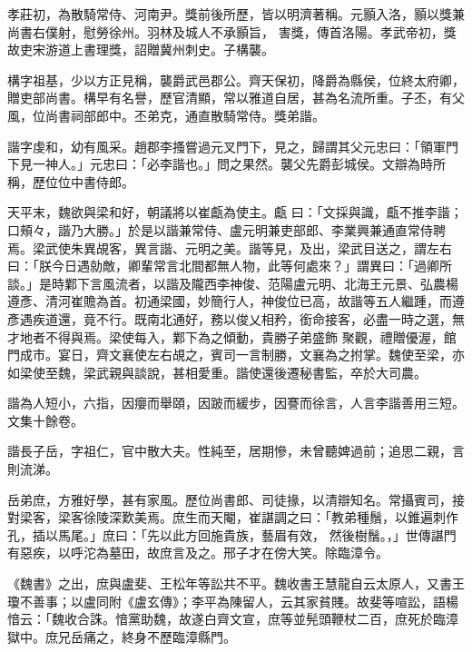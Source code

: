 \begin{pinyinscope}
 孝莊初，為散騎常侍、河南尹。獎前後所歷，皆以明濟著稱。元顥入洛，顥以獎兼尚書右僕射，慰勞徐州。羽林及城人不承顥旨，
 害獎，傳首洛陽。孝武帝初，獎故吏宋游道上書理獎，詔贈冀州刺史。子構襲。



 構字祖基，少以方正見稱，襲爵武邑郡公。齊天保初，降爵為縣侯，位終太府卿，贈吏部尚書。構早有名譽，歷官清顯，常以雅道自居，甚為名流所重。子丕，有父風，位尚書祠部郎中。丕弟克，通直散騎常侍。獎弟諧。



 諧字虔和，幼有風采。趙郡李搔嘗過元叉門下，見之，歸謂其父元忠曰：「領軍門下見一神人。」元忠曰：「必李諧也。」問之果然。襲父先爵彭城侯。文辯為時所稱，歷位位中書侍郎。



 天平末，魏欲與梁和好，朝議將以崔甗為使主。甗
 曰：「文採與識，甗不推李諧；口頰々，諧乃大勝。」於是以諧兼常侍、盧元明兼吏部郎、李業興兼通直常侍聘焉。梁武使朱異覘客，異言諧、元明之美。諧等見，及出，梁武目送之，謂左右曰：「朕今日遇勍敵，卿輩常言北間都無人物，此等何處來？」謂異曰：「過卿所談。」是時鄴下言風流者，以諧及隴西李神俊、范陽盧元明、北海王元景、弘農楊遵彥、清河崔贍為首。初通梁國，妙簡行人，神俊位已高，故諧等五人繼踵，而遵彥遇疾道還，竟不行。既南北通好，務以俊乂相矜，銜命接客，必盡一時之選，無才地者不得與焉。梁使每入，鄴下為之傾動，貴勝子弟盛飾
 聚觀，禮贈優渥，館門成市。宴日，齊文襄使左右覘之，賓司一言制勝，文襄為之拊掌。魏使至梁，亦如梁使至魏，梁武親與談說，甚相愛重。諧使還後遷秘書監，卒於大司農。



 諧為人短小，六指，因癭而舉頤，因跛而緩步，因謇而徐言，人言李諧善用三短。文集十餘卷。



 諧長子岳，字祖仁，官中散大夫。性純至，居期慘，未曾聽婢過前；追思二親，言則流涕。



 岳弟庶，方雅好學，甚有家風。歷位尚書郎、司徒掾，以清辯知名。常攝賓司，接對梁客，梁客徐陵深歎美焉。庶生而天閹，崔諶調之曰：「教弟種鬚，以錐遍刺作孔，插以馬尾。」庶曰：「先以此方回施貴族，藝眉有效，
 然後樹鬚。，」世傳諶門有惡疾，以呼沱為墓田，故庶言及之。邢子才在傍大笑。除臨漳令。



 《魏書》之出，庶與盧斐、王松年等訟共不平。魏收書王慧龍自云太原人，又書王瓊不善事；以盧同附《盧玄傳》；李平為陳留人，云其家貧賤。故斐等喧訟，語楊愔云：「魏收合誅。愔黨助魏，故遂白齊文宣，庶等並髡頭鞭杖二百，庶死於臨漳獄中。庶兄岳痛之，終身不歷臨漳縣門。




\end{pinyinscope}
